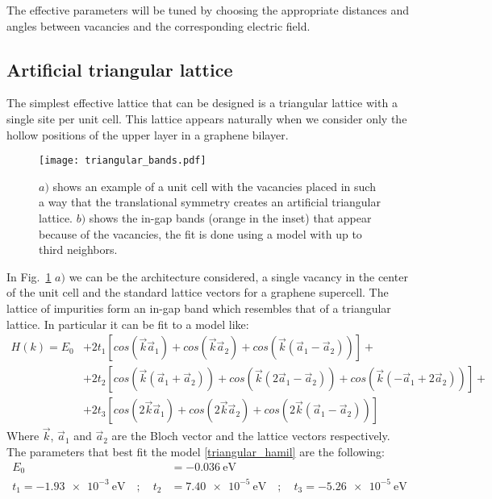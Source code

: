 \documentclass[a4paper]{article}
\begin{document}
The effective parameters will be tuned by choosing the appropriate distances and angles between vacancies and the corresponding electric field.


\subsection{Artificial triangular lattice}
The simplest effective lattice that can be designed is a triangular lattice with a single site per unit cell. This lattice appears naturally when we consider only the hollow positions of the upper layer in a graphene bilayer.

\begin{figure}[h!]
  \centering
  \texttt{[image: triangular\_bands.pdf]}
  \vspace{-5pt}
  \caption{$a)$ shows an example of a unit cell with the vacancies placed in such a way that the translational symmetry creates an artificial triangular lattice. $b)$ shows the in-gap bands (orange in the inset) that appear because of the vacancies, the fit is done using a model with up to third neighbors.}
  \label{triangular}
\end{figure}
\FloatBarrier

In Fig.~\ref{triangular} $a)$ we can be the architecture considered, a single vacancy in the center of the unit cell and the standard lattice vectors for a graphene supercell. The lattice of impurities form an in-gap band which resembles that of a triangular lattice.
In particular it can be fit to a model like:
\begin{equation}
\begin{split}
  H(k) = E_0 &+
         2t_1\left[ cos\left(\vec{k}\vec{a}_1\right) +
                    cos\left(\vec{k}\vec{a}_2\right) +
                    cos\left(\vec{k}(\vec{a}_1-\vec{a}_2)\right)
              \right] +\\
         &+2t_2\left[ cos\left(\vec{k}(\vec{a}_1+\vec{a}_2)\right) +
                    cos\left(\vec{k}(2\vec{a}_1-\vec{a}_2)\right) +
                    cos\left(\vec{k}(-\vec{a}_1+2\vec{a}_2)\right)
             \right] +\\
         &+2t_3\left[ cos\left(2\vec{k}\vec{a}_1\right) +
                    cos\left(2\vec{k}\vec{a}_2\right) +
                    cos\left(2\vec{k}(\vec{a}_1-\vec{a}_2)\right)
              \right]
\end{split}
\label{triangular_hamil}
\end{equation}
Where $\vec{k}$, $\vec{a}_1$ and $\vec{a}_2$ are the Bloch vector and the lattice vectors respectively. The parameters that best fit the model \eqref{triangular_hamil} are the following:
\begin{equation}
\begin{split}
  E_0 &= \SI{-0.036}{\eV}\\
  t_1 = \SI{-1.93e-3}{\eV} \quad;\quad
  t_2 &= \SI{7.40e-5}{\eV} \quad;\quad
  t_3 = \SI{-5.26e-5}{\eV}
\end{split}
\end{equation}
\end{document}
